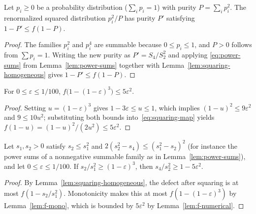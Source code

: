 \begin{lemma}
  \label{lem:squaring}
  \leanok
  Let \(p_i \ge 0\) be a probability distribution (\(\sum_i p_i = 1\)) with purity
  \(P = \sum_i p_i^2\). The renormalized squared distribution \(p_i^2 / P\) has purity \(P'\)
  satisfying \(1 - P' \le f(1 - P)\).
\end{lemma}
\begin{proof}
  \leanok
  The families \(p_i^2\) and \(p_i^4\) are summable because \(0 \le p_i \le 1\), and \(P > 0\)
  follows from \(\sum p_i = 1\). Writing the new purity as \(P' = S_4 / S_2^2\) and applying
  \eqref{eq:power-sums} from Lemma~\ref{lem:power-sums} together with
  Lemma~\ref{lem:squaring-homogeneous} gives \(1 - P' \le f(1 - P)\).
\end{proof}

\begin{lemma}
  \label{lem:f-numerical}
  \leanok
  For \(0 \le \varepsilon \le 1/100\), \(f\bigl(1 - (1 - \varepsilon)^3\bigr) \le 5 \varepsilon^2\).
\end{lemma}
\begin{proof}
  \leanok
  Setting \(u = (1 - \varepsilon)^3\) gives \(1 - 3\varepsilon \le u \le 1\), which implies
  \((1 - u)^2 \le 9 \varepsilon^2\) and \(9 \le 10 u^2\); substituting both bounds
  into~\eqref{eq:squaring-map} yields \(f(1 - u) = (1-u)^2/(2u^2) \le 5\varepsilon^2\).
\end{proof}

\begin{lemma}
  \label{lem:squaring-step}
  \leanok
  Let \(s_1, s_2 > 0\) satisfy \(s_2 \le s_1^2\) and \(2 (s_2^2 - s_4) \le (s_1^2 - s_2)^2\) (for
  instance the power sums of a nonnegative summable family as in Lemma~\ref{lem:power-sums}), and
  let \(0 \le \varepsilon \le 1/100\). If \(s_2 / s_1^2 \ge (1 - \varepsilon)^3\), then
  \(s_4 / s_2^2 \ge 1 - 5 \varepsilon^2\).
\end{lemma}
\begin{proof}
  \leanok
  By Lemma~\ref{lem:squaring-homogeneous}, the defect after squaring is at most
  \(f(1 - s_2/s_1^2)\). Monotonicity makes this at most \(f(1 - (1-\varepsilon)^3)\) by
  Lemma~\ref{lem:f-mono}, which is bounded by \(5\varepsilon^2\) by Lemma~\ref{lem:f-numerical}.
\end{proof}

